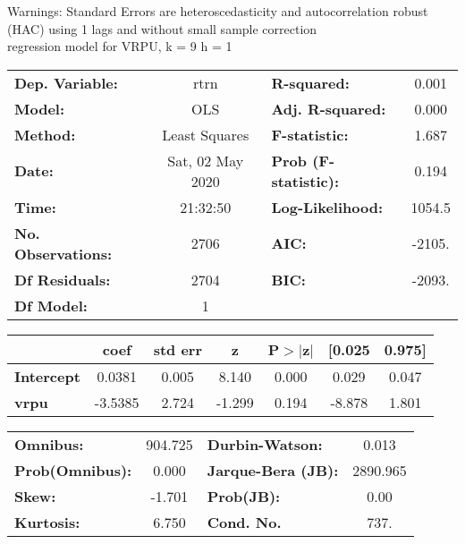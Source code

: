 Warnings: \newline
 [1] Standard Errors are heteroscedasticity and autocorrelation robust (HAC) using 1 lags and without small sample correction\\ 

regression model for VRPU, k = 9 h = 1\begin{center}
\begin{tabular}{lclc}
\toprule
\textbf{Dep. Variable:}    &       rtrn       & \textbf{  R-squared:         } &     0.001   \\
\textbf{Model:}            &       OLS        & \textbf{  Adj. R-squared:    } &     0.000   \\
\textbf{Method:}           &  Least Squares   & \textbf{  F-statistic:       } &     1.687   \\
\textbf{Date:}             & Sat, 02 May 2020 & \textbf{  Prob (F-statistic):} &    0.194    \\
\textbf{Time:}             &     21:32:50     & \textbf{  Log-Likelihood:    } &    1054.5   \\
\textbf{No. Observations:} &        2706      & \textbf{  AIC:               } &    -2105.   \\
\textbf{Df Residuals:}     &        2704      & \textbf{  BIC:               } &    -2093.   \\
\textbf{Df Model:}         &           1      & \textbf{                     } &             \\
\bottomrule
\end{tabular}
\begin{tabular}{lcccccc}
                   & \textbf{coef} & \textbf{std err} & \textbf{z} & \textbf{P$> |$z$|$} & \textbf{[0.025} & \textbf{0.975]}  \\
\midrule
\textbf{Intercept} &       0.0381  &        0.005     &     8.140  &         0.000        &        0.029    &        0.047     \\
\textbf{vrpu}      &      -3.5385  &        2.724     &    -1.299  &         0.194        &       -8.878    &        1.801     \\
\bottomrule
\end{tabular}
\begin{tabular}{lclc}
\textbf{Omnibus:}       & 904.725 & \textbf{  Durbin-Watson:     } &    0.013  \\
\textbf{Prob(Omnibus):} &   0.000 & \textbf{  Jarque-Bera (JB):  } & 2890.965  \\
\textbf{Skew:}          &  -1.701 & \textbf{  Prob(JB):          } &     0.00  \\
\textbf{Kurtosis:}      &   6.750 & \textbf{  Cond. No.          } &     737.  \\
\bottomrule
\end{tabular}
\end{center}

